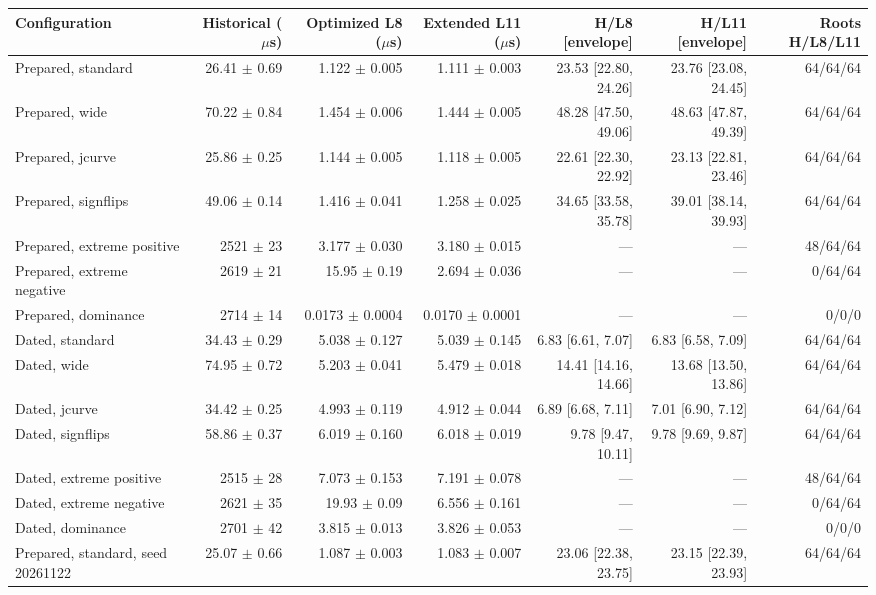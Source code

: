\begin{tabular}{lrrrrrr}
\toprule
Configuration & Historical ($\mu$s) & Optimized L8 ($\mu$s) & Extended L11 ($\mu$s) & H/L8 [envelope] & H/L11 [envelope] & Roots H/L8/L11 \\
\midrule
Prepared, standard & 26.41 $\pm$ 0.69 & 1.122 $\pm$ 0.005 & 1.111 $\pm$ 0.003 & 23.53 [22.80, 24.26] & 23.76 [23.08, 24.45] & 64/64/64 \\
Prepared, wide & 70.22 $\pm$ 0.84 & 1.454 $\pm$ 0.006 & 1.444 $\pm$ 0.005 & 48.28 [47.50, 49.06] & 48.63 [47.87, 49.39] & 64/64/64 \\
Prepared, jcurve & 25.86 $\pm$ 0.25 & 1.144 $\pm$ 0.005 & 1.118 $\pm$ 0.005 & 22.61 [22.30, 22.92] & 23.13 [22.81, 23.46] & 64/64/64 \\
Prepared, signflips & 49.06 $\pm$ 0.14 & 1.416 $\pm$ 0.041 & 1.258 $\pm$ 0.025 & 34.65 [33.58, 35.78] & 39.01 [38.14, 39.93] & 64/64/64 \\
Prepared, extreme positive & 2521 $\pm$ 23 & 3.177 $\pm$ 0.030 & 3.180 $\pm$ 0.015 & --- & --- & 48/64/64 \\
Prepared, extreme negative & 2619 $\pm$ 21 & 15.95 $\pm$ 0.19 & 2.694 $\pm$ 0.036 & --- & --- & 0/64/64 \\
Prepared, dominance & 2714 $\pm$ 14 & 0.0173 $\pm$ 0.0004 & 0.0170 $\pm$ 0.0001 & --- & --- & 0/0/0 \\
Dated, standard & 34.43 $\pm$ 0.29 & 5.038 $\pm$ 0.127 & 5.039 $\pm$ 0.145 & 6.83 [6.61, 7.07] & 6.83 [6.58, 7.09] & 64/64/64 \\
Dated, wide & 74.95 $\pm$ 0.72 & 5.203 $\pm$ 0.041 & 5.479 $\pm$ 0.018 & 14.41 [14.16, 14.66] & 13.68 [13.50, 13.86] & 64/64/64 \\
Dated, jcurve & 34.42 $\pm$ 0.25 & 4.993 $\pm$ 0.119 & 4.912 $\pm$ 0.044 & 6.89 [6.68, 7.11] & 7.01 [6.90, 7.12] & 64/64/64 \\
Dated, signflips & 58.86 $\pm$ 0.37 & 6.019 $\pm$ 0.160 & 6.018 $\pm$ 0.019 & 9.78 [9.47, 10.11] & 9.78 [9.69, 9.87] & 64/64/64 \\
Dated, extreme positive & 2515 $\pm$ 28 & 7.073 $\pm$ 0.153 & 7.191 $\pm$ 0.078 & --- & --- & 48/64/64 \\
Dated, extreme negative & 2621 $\pm$ 35 & 19.93 $\pm$ 0.09 & 6.556 $\pm$ 0.161 & --- & --- & 0/64/64 \\
Dated, dominance & 2701 $\pm$ 42 & 3.815 $\pm$ 0.013 & 3.826 $\pm$ 0.053 & --- & --- & 0/0/0 \\
Prepared, standard, seed 20261122 & 25.07 $\pm$ 0.66 & 1.087 $\pm$ 0.003 & 1.083 $\pm$ 0.007 & 23.06 [22.38, 23.75] & 23.15 [22.39, 23.93] & 64/64/64 \\

\end{tabular}
